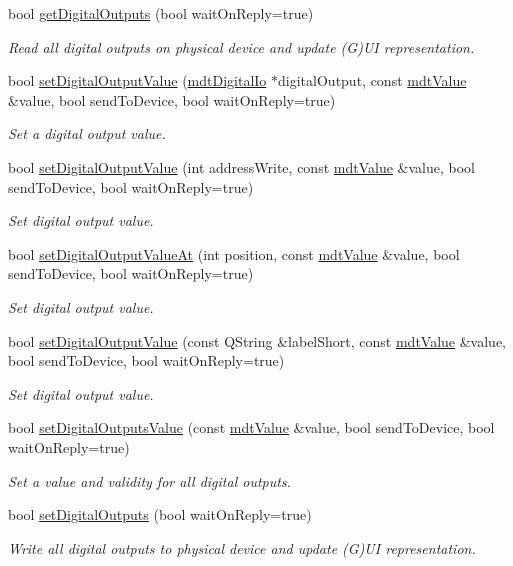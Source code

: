 \begin{DoxyCompactItemize}
bool \hyperlink{classmdt_multi_io_device_aeb093a59af6b6cac16e32f4ad37652f4}{get\-Digital\-Outputs} (bool wait\-On\-Reply=true)
\begin{DoxyCompactList}\small\item\em Read all digital outputs on physical device and update (G)U\-I representation. \end{DoxyCompactList}\item 
bool \hyperlink{classmdt_multi_io_device_ab23b12d0916cb7e750dbe463d7d7527f}{set\-Digital\-Output\-Value} (\hyperlink{classmdt_digital_io}{mdt\-Digital\-Io} $\ast$digital\-Output, const \hyperlink{classmdt_value}{mdt\-Value} \&value, bool send\-To\-Device, bool wait\-On\-Reply=true)
\begin{DoxyCompactList}\small\item\em Set a digital output value. \end{DoxyCompactList}\item 
bool \hyperlink{classmdt_multi_io_device_a94713dbfd20d12715f4563538d238ce4}{set\-Digital\-Output\-Value} (int address\-Write, const \hyperlink{classmdt_value}{mdt\-Value} \&value, bool send\-To\-Device, bool wait\-On\-Reply=true)
\begin{DoxyCompactList}\small\item\em Set digital output value. \end{DoxyCompactList}\item 
bool \hyperlink{classmdt_multi_io_device_a3bc6062b473c309fa8bb7d1fc2ef8392}{set\-Digital\-Output\-Value\-At} (int position, const \hyperlink{classmdt_value}{mdt\-Value} \&value, bool send\-To\-Device, bool wait\-On\-Reply=true)
\begin{DoxyCompactList}\small\item\em Set digital output value. \end{DoxyCompactList}\item 
bool \hyperlink{classmdt_multi_io_device_afb9ff7dc4003c7cb55ee8d62dd7f01c1}{set\-Digital\-Output\-Value} (const Q\-String \&label\-Short, const \hyperlink{classmdt_value}{mdt\-Value} \&value, bool send\-To\-Device, bool wait\-On\-Reply=true)
\begin{DoxyCompactList}\small\item\em Set digital output value. \end{DoxyCompactList}\item 
bool \hyperlink{classmdt_multi_io_device_a8124d0cf35b23e515e6d5cf5ce114e7a}{set\-Digital\-Outputs\-Value} (const \hyperlink{classmdt_value}{mdt\-Value} \&value, bool send\-To\-Device, bool wait\-On\-Reply=true)
\begin{DoxyCompactList}\small\item\em Set a value and validity for all digital outputs. \end{DoxyCompactList}\item 
bool \hyperlink{classmdt_multi_io_device_a83f6df71dc35ef002ee55b3a51a54fc9}{set\-Digital\-Outputs} (bool wait\-On\-Reply=true)
\begin{DoxyCompactList}\small\item\em Write all digital outputs to physical device and update (G)U\-I representation. \end{DoxyCompactList}\end{DoxyCompactItemize}
